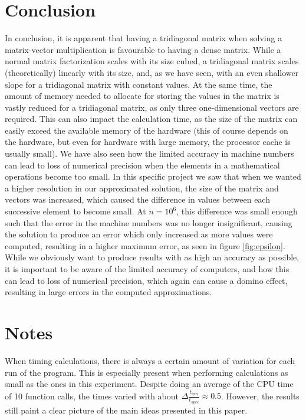 \documentclass[a4paper,10pt,English]{article}
\begin{document}
\section{Conclusion}


In conclusion, it is apparent that having a tridiagonal matrix when solving a matrix-vector multiplication is favourable to having a dense matrix. While a normal matrix factorization scales with its size cubed, a tridiagonal matrix scales (theoretically) linearly with its size, and, as we have seen, with an even shallower slope for a tridiagonal matrix with constant values. At the same time, the amount of memory needed to allocate for storing the values in the matrix is vastly reduced for a tridiagonal matrix, as only three one-dimensional vectors are required. This can also impact the calculation time, as the size of the matrix can easily exceed the available memory of the hardware (this of course depends on the hardware, but even for hardware with large memory, the processor cache is usually small). We have also seen how the limited accuracy in machine numbers can lead to loss of numerical precision when the elements in a mathematical operations become too small. In this specific project we saw that when we wanted a higher resolution in our approximated solution, the size of the matrix and vectors was increased, which caused the difference in values between each successive element to become small. At $n=10^6$, this difference was small enough such that the error in the machine numbers was no longer insignificant, causing the solution to produce an error which only increased as more values were computed, resulting in a higher maximum error, as seen in figure \ref{fig:epsilon}. While we obviously want to produce results with as high an accuracy as possible, it is important to be aware of the limited accuracy of computers, and how this can lead to loss of numerical precision, which again can cause a domino effect, resulting in large errors in the computed approximations. 


\section*{Notes}

When timing calculations, there is always a certain amount of variation for each run of the program. This is especially present when performing calculations as small as the ones in this experiment. Despite doing an average of the CPU time of 10 function calls, the times varied with about $\Delta \frac{t_{gen}}{t_{spec}} \approx 0.5$. However, the results still paint a clear picture of the main ideas presented in this paper.

\printbibheading
\printbibliography
\end{document}
